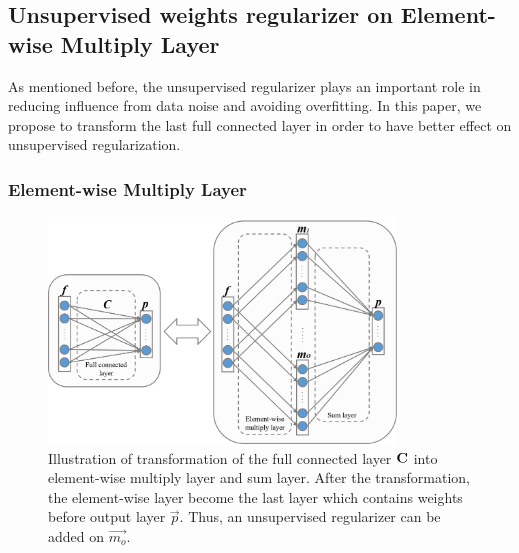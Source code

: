 \documentclass[runningheads]{llncs}
\begin{document}
\subsection{Unsupervised weights regularizer on Element-wise Multiply Layer}
\label{Section:Unsupervised weights regularizer on Element-wise Multiply Layer}

As mentioned before, the unsupervised regularizer plays an important role in reducing influence from data noise and avoiding overfitting. In this paper, we propose to transform the last full connected layer in order to have better effect on unsupervised regularization.

\subsubsection{Element-wise Multiply Layer}
\label{section:Element-wise Multiply Layer}

\begin{figure}
\centering
\includegraphics[height=6cm]{images/elementwiselayer.png}
\caption{Illustration of transformation of the full connected layer ${\bf C}$ into element-wise multiply layer and sum layer. After the transformation, the element-wise layer become the last layer which contains weights before output layer $\vec{p}$. Thus, an unsupervised regularizer can be added on $\vec{m_{o}}$.}
\label{fig:elementwiselayer}
\end{figure}
\end{document}
